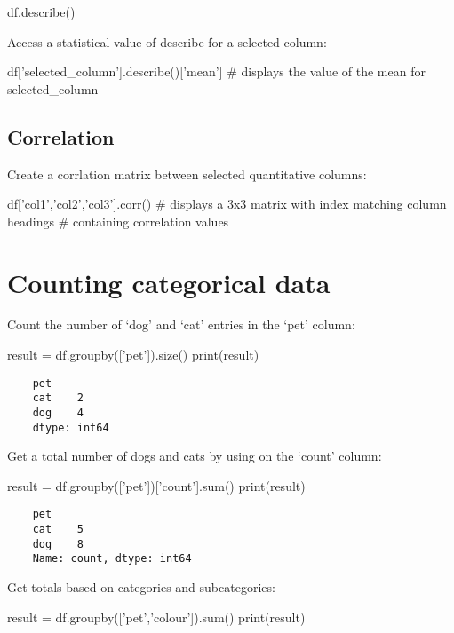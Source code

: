 \begin{pycode}
    df.describe()
\end{pycode}

Access a statistical value of describe for a selected column:

\begin{pycode}
    df['selected_column'].describe()['mean'] # displays the value of the mean for selected_column
\end{pycode}

\subsection{Correlation}

Create a corrlation matrix between selected quantitative columns:

\begin{pycode}
    df['col1','col2','col3'].corr()
    # displays a 3x3 matrix with index matching column headings
    # containing correlation values
\end{pycode}

\section{Counting categorical data}

Count the number of `dog' and `cat' entries in the `pet' column:

\begin{pycode}
    result = df.groupby(['pet']).size()
    print(result)
\end{pycode}

\begin{verbatim}
    pet
    cat    2
    dog    4
    dtype: int64
\end{verbatim}

Get a total number of dogs and cats by using  on the `count' column:

\begin{pycode}
    result = df.groupby(['pet'])['count'].sum()
    print(result)
\end{pycode}

\begin{verbatim}
    pet
    cat    5
    dog    8
    Name: count, dtype: int64
\end{verbatim}


\newpage

Get totals based on categories and subcategories:

\begin{pycode}
    result = df.groupby(['pet','colour']).sum()
    print(result)
\end{pycode}

